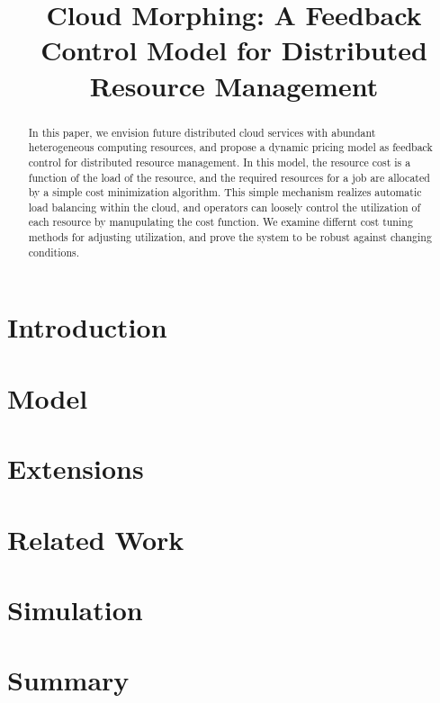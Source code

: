 \documentclass[10pt,sigconf,letterpaper,anonymous,nonacm]{acmart}
\title{Cloud Morphing: A Feedback Control Model for Distributed Resource Management}
\begin{document}
\begin{abstract}

In this paper, we envision future distributed cloud services with
abundant heterogeneous computing resources,
and propose a dynamic pricing model as feedback control for
distributed resource management.
In this model, the resource cost is a function of the load of the
resource, and the required resources for a job are allocated by a
simple cost minimization algorithm.  This simple mechanism realizes
automatic load balancing within the cloud, and operators can loosely
control the utilization of each resource by manupulating the cost function.
We examine differnt cost tuning methods for adjusting utilization, and
prove the system to be robust against changing conditions.

\end{abstract}

\maketitle

\section{Introduction}



\section{Model}



\section{Extensions}



\section{Related Work}



\section{Simulation}



\section{Summary}



\end{document}
